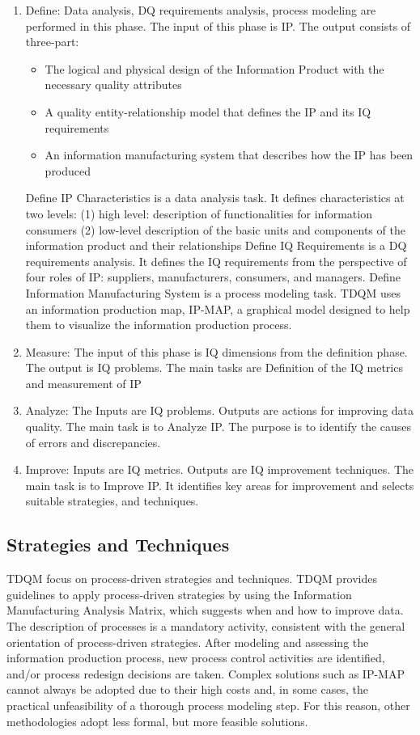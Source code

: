 \documentclass[pdftex,english,oribibl]{llncs}
\begin{document}
\begin{enumerate}
    \item Define: Data analysis, DQ requirements analysis, process modeling are performed in this phase. The input of this phase is IP. The output consists of three-part:
    \begin{itemize}
        \item The logical and physical design of the Information Product with the necessary quality attributes
        \item A quality entity-relationship model that defines the IP and its IQ requirements
        \item An information manufacturing system that describes how the IP has been produced
    \end{itemize}
    Define IP Characteristics is a data analysis task. It defines characteristics at two levels: (1) high level: description of functionalities for information consumers
(2) low-level description of the basic units and components of the information product and their relationships
Define IQ Requirements is a DQ requirements analysis. It defines the IQ requirements from the perspective of four roles of IP: suppliers, manufacturers, consumers, and managers.
Define Information Manufacturing System is a process modeling task.
TDQM uses an information production map, IP-MAP, a graphical model designed to help them to visualize the information production process.
    \item  Measure: The input of this phase is IQ dimensions from the definition phase. The output is IQ problems. The main tasks are Definition of the IQ metrics and measurement of IP
    \item Analyze: The Inputs are IQ problems. Outputs are actions for improving data quality. The main task is to Analyze IP. The purpose is to identify the causes of errors and discrepancies.
    \item Improve: Inputs are  IQ metrics. Outputs are IQ improvement techniques. The main task is to Improve IP. It identifies key areas for improvement and selects suitable strategies, and techniques.
\end{enumerate}
\subsection{Strategies and Techniques}
TDQM focus on process-driven strategies and techniques. TDQM provides guidelines to apply process-driven strategies by using the Information Manufacturing Analysis Matrix\cite{Ballou1998ModelingInformation}, which suggests when and how to improve data. The description of processes is a mandatory activity, consistent with the general orientation of process-driven strategies. After modeling and assessing the information production process, new process control activities are identified, and/or process redesign decisions are taken.  Complex solutions such as IP-MAP cannot always be adopted due to their high costs and, in some cases, the practical unfeasibility of a thorough process modeling step. For this reason, other methodologies adopt less formal, but more feasible solutions.
\end{document}
